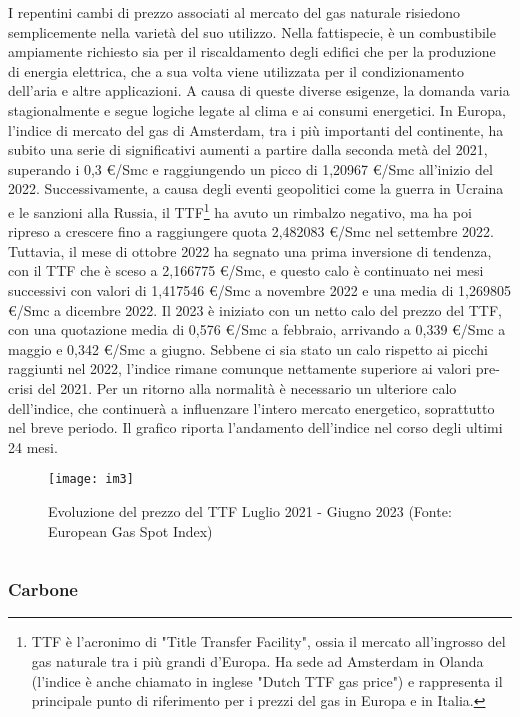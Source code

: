 \documentclass[12pt,a4paper]{report}
\begin{document}
I repentini cambi di prezzo associati al mercato del gas naturale risiedono semplicemente nella varietà del suo utilizzo. Nella fattispecie, è un combustibile ampiamente richiesto sia per il riscaldamento degli edifici che per la produzione di energia elettrica, che a sua volta viene utilizzata per il condizionamento dell'aria e altre applicazioni. A causa di queste diverse esigenze, la domanda varia stagionalmente e segue logiche legate al clima e ai consumi energetici.
In Europa, l'indice di mercato del gas di Amsterdam, tra i più importanti del continente, ha subito una serie di significativi aumenti a partire dalla seconda metà del 2021, superando i 0,3 €/Smc e raggiungendo un picco di 1,20967 €/Smc all'inizio del 2022. Successivamente, a causa degli eventi geopolitici come la guerra in Ucraina e le sanzioni alla Russia, il TTF\footnote{ TTF è l’acronimo di "Title Transfer Facility", ossia il mercato all’ingrosso del gas naturale tra i più grandi d’Europa. Ha sede ad Amsterdam in Olanda (l’indice è anche chiamato in inglese "Dutch TTF gas price") e rappresenta il principale punto di riferimento per i prezzi del gas in Europa e in Italia.} ha avuto un rimbalzo negativo, ma ha poi ripreso a crescere fino a raggiungere quota 2,482083 €/Smc nel settembre 2022.
Tuttavia, il mese di ottobre 2022 ha segnato una prima inversione di tendenza, con il TTF che è sceso a 2,166775 €/Smc, e questo calo è continuato nei mesi successivi con valori di 1,417546 €/Smc a novembre 2022 e una media di 1,269805 €/Smc a dicembre 2022.
Il 2023 è iniziato con un netto calo del prezzo del TTF, con una quotazione media di 0,576 €/Smc a febbraio, arrivando a 0,339 €/Smc a maggio e 0,342 €/Smc a giugno. Sebbene ci sia stato un calo rispetto ai picchi raggiunti nel 2022, l'indice rimane comunque nettamente superiore ai valori pre-crisi del 2021.
Per un ritorno alla normalità è necessario un ulteriore calo dell’indice, che continuerà a influenzare l'intero mercato energetico, soprattutto nel breve periodo. Il grafico riporta l’andamento dell’indice nel corso degli ultimi 24 mesi.
$$
$$
\begin{figure}
     [ht]
    \centering
    \texttt{[image: im3]}
    \caption{Evoluzione del prezzo del TTF Luglio 2021 - Giugno 2023 
            (Fonte: European Gas Spot Index)}
    \label{fig:enter-label2}
\end{figure}
$$
$$

\subsubsection{Carbone}
\end{document}
